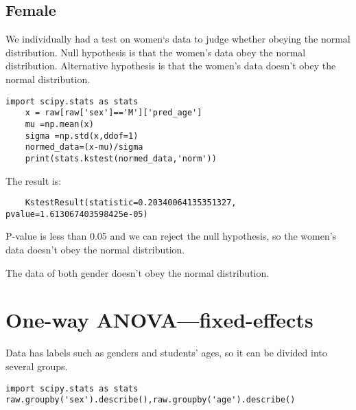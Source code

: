 \documentclass[fancy,11pt,twocol]{elegantbook}
\begin{document}
\section{Female}
We individually had a test on women‘s data to judge whether obeying the normal distribution.
Null hypothesis is that the women's data obey the normal distribution.
Alternative hypothesis is that the women's data doesn't obey the normal distribution.
\begin{lstlisting}
import scipy.stats as stats
	x = raw[raw['sex']=='M']['pred_age']
	mu =np.mean(x)
	sigma =np.std(x,ddof=1)
	normed_data=(x-mu)/sigma
	print(stats.kstest(normed_data,'norm'))
\end{lstlisting}
The result is:
\begin{lstlisting}
	KstestResult(statistic=0.20340064135351327, pvalue=1.613067403598425e-05)
\end{lstlisting}
P-value is less than 0.05 and we can reject the null hypothesis, so the women's data doesn't obey the normal distribution.

The data of both gender doesn't obey the normal distribution.

\chapter{One-way ANOVA—fixed-effects}
Data has labels such as genders and students' ages, so it can be divided into several groups.

\begin{lstlisting}
import scipy.stats as stats
raw.groupby('sex').describe(),raw.groupby('age').describe()
\end{lstlisting}
\end{document}
